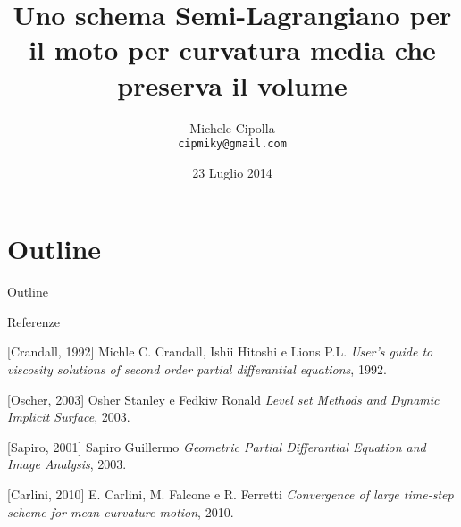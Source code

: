 \documentclass[10pt]{beamer}
\title{Uno schema Semi-Lagrangiano per il moto per curvatura media che
  preserva il volume}
\author{Michele Cipolla \\
\texttt{cipmiky@gmail.com}}
\institute[Dip. Matematica]{Univeristà la Sapienza di Roma}
\date{23 Luglio 2014}
\begin{document}
%
%
\begin{frame}
\titlepage
\end{frame}
%
%
\section*{Outline}
\begin{frame}{Outline}
\tableofcontents
\end{frame}
%
%





%
%
\begin{frame}{Referenze}
\begin{thebibliography}{bella}
[Crandall, 1992]
  Michle C. Crandall, Ishii Hitoshi e Lions P.L.
  \newblock \emph{User's guide to viscosity solutions of second order
    partial differantial equations}, 1992.

[Oscher, 2003] 
  Osher Stanley e Fedkiw Ronald
  \newblock \emph{Level set Methods and Dynamic Implicit Surface}, 2003.

[Sapiro, 2001] 
  Sapiro Guillermo
  \newblock \emph{Geometric Partial Differantial Equation and Image
    Analysis}, 2003.

[Carlini, 2010] 
  E. Carlini, M. Falcone e R. Ferretti
  \newblock \emph{Convergence of large time-step scheme for mean
    curvature motion}, 2010.

\end{thebibliography}
\end{frame}
%
%
%
\end{document}
